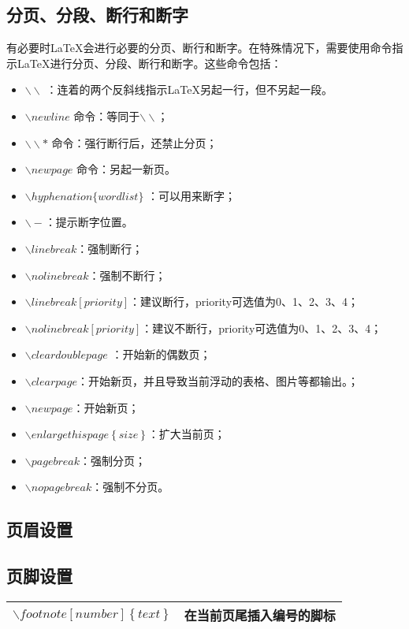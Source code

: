 \documentclass[11pt]{book}
\newcounter{#2}
\newcounter{#2}[#1]
\numberwithin{#2}{#1}
\begin{document}
				\subsection{分页、分段、断行和断字}
		有必要时\LaTeX 会进行必要的分页、断行和断字。在特殊情况下，需要使用命令指示\LaTeX 进行分页、分段、断行和断字。这些命令包括：
		\begin{itemize}
			\item $ \backslash \backslash $ ：连着的两个反斜线指示\LaTeX 另起一行，但不另起一段。
			\item $ \backslash newline $ 命令：等同于$ \backslash \backslash $；
			\item $ \backslash \backslash* $ 命令：强行断行后，还禁止分页；
			\item $ \backslash newpage $ 命令：另起一新页。
			\item $ \backslash hyphenation\{word list\} $ ：可以用来断字；
			\item $ \backslash- $：提示断字位置。
			\item $ \backslash linebreak $：强制断行；
			\item $ \backslash nolinebreak $：强制不断行；
			\item $ \backslash linebreak[priority] $：建议断行，priority可选值为0、1、2、3、4；
			\item $ \backslash nolinebreak[priority] $：建议不断行，priority可选值为0、1、2、3、4；
			\item $ \backslash cleardoublepage $ ：开始新的偶数页；
			\item $ \backslash clearpage $：开始新页，并且导致当前浮动的表格、图片等都输出。；
			\item $ \backslash newpage $：开始新页；
			\item $ \backslash enlargethispage\left\lbrace size\right\rbrace  $：扩大当前页；
			\item $ \backslash pagebreak $：强制分页；
			\item $ \backslash nopagebreak $：强制不分页。
			
		\end{itemize}
		\subsection{页眉设置}
		\subsection{页脚设置}
		\begin{tabular}{|l|l|}
			\hline
			$ \backslash footnote[number]\left\lbrace text\right\rbrace $ & 在当前页尾插入编号的脚标 \\
			\hline
		\end{tabular}
\end{document}
